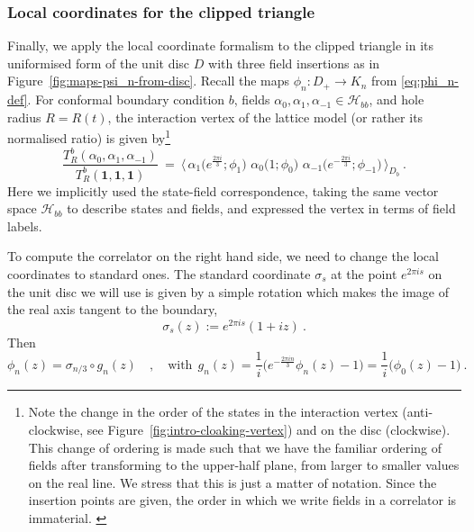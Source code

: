\documentclass[11pt,a4paper]{article}
\numberwithin{equation}{section}
\newcommand{\one}{\mathbf{1}} %
\begin{document}
\subsubsection{Local coordinates for the clipped triangle}

Finally, we apply the local coordinate formalism to the clipped triangle in its uniformised form of the unit disc $D$ with three field insertions as in Figure~\ref{fig:maps-psi_n-from-disc}. Recall the maps $\phi_n : D_+ \to K_n$ from \eqref{eq:phi_n-def}.
For conformal boundary condition $b$,
fields $\alpha_0,\alpha_1,\alpha_{-1} \in \mathcal{H}_{bb}$, and hole radius $R = R(t)$, the interaction vertex of the lattice model (or rather its normalised ratio) is given by\footnote{Note the change in the order of the states in the interaction vertex (anti-clockwise, see Figure~\ref{fig:intro-cloaking-vertex}) and on the disc (clockwise). This change of ordering is made such that we have the familiar ordering of fields after transforming to the upper-half plane, from larger to smaller values on the real line. We stress that this is just a matter of notation. Since the insertion points are given, the order in which we write fields in a correlator is immaterial.
\label{fn:order-change}
}
\begin{equation}\label{eq:T-def}
\frac{T_R^b(\alpha_0,\alpha_1,\alpha_{-1})}{T_R^b(\one,\one,\one)}
~=~ 
\Big\langle 
\,\alpha_1\big(e^{\frac{2 \pi i}3};\phi_1\big)
\,\,\alpha_0\big(1;\phi_0\big)
\,\,\alpha_{-1}\big(e^{-\frac{2 \pi i}3};\phi_{-1}\big)
\,\Big\rangle_{\!D_b} ~.
\end{equation}
Here we implicitly used the state-field correspondence, taking the same vector space $\mathcal{H}_{bb}$ to describe states and fields, and expressed the vertex in terms of field labels.

To compute the correlator on the right hand side, we need to change the local coordinates to standard ones. The standard coordinate $\sigma_s$ at the point $e^{2 \pi i s}$ on the unit disc we will use is given by a simple rotation which makes the image of the real axis tangent to the boundary,
\begin{equation}\label{eq:disc-standard-ciird}
\sigma_s(z) := e^{2 \pi i s} (1+ i z) ~.
\end{equation}
Then
\begin{equation}\label{eq:phi_n-coord-deform}
\phi_n(z) = \sigma_{n/3} \circ g_n(z) 
\quad , \quad
\text{with}
~~
g_n(z) = \frac1i \Big( e^{-\frac{2\pi i n}3} \phi_n(z)-1 \Big)
= \frac1i \big( \phi_0(z)-1 \big)~.
\end{equation}
\end{document}
